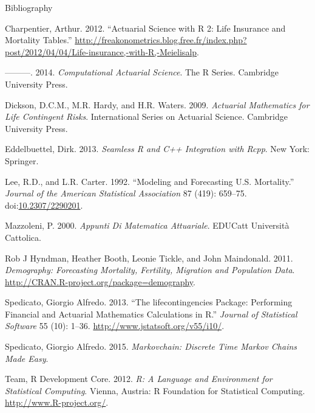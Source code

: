 \begin{frame}[allowframebreaks]{Bibliography}

Charpentier, Arthur. 2012. ``Actuarial Science with R 2: Life Insurance
and Mortality Tables.''
\url{http://freakonometrics.blog.free.fr/index.php?post/2012/04/04/Life-insurance,-with-R,-Meielisalp}.

---------. 2014. \emph{Computational Actuarial Science}. The R Series.
Cambridge University Press.

Dickson, D.C.M., M.R. Hardy, and H.R. Waters. 2009. \emph{Actuarial
Mathematics for Life Contingent Risks}. International Series on
Actuarial Science. Cambridge University Press.

Eddelbuettel, Dirk. 2013. \emph{Seamless R and C++ Integration with
Rcpp}. New York: Springer.

Lee, R.D., and L.R. Carter. 1992. ``Modeling and Forecasting U.S.
Mortality.'' \emph{Journal of the American Statistical Association} 87
(419): 659--75.
doi:\href{http://dx.doi.org/10.2307/2290201}{10.2307/2290201}.

Mazzoleni, P. 2000. \emph{Appunti Di Matematica Attuariale}. EDUCatt
Università Cattolica.

Rob J Hyndman, Heather Booth, Leonie Tickle, and John Maindonald. 2011.
\emph{Demography: Forecasting Mortality, Fertility, Migration and
Population Data}. \url{http://CRAN.R-project.org/package=demography}.

Spedicato, Giorgio Alfredo. 2013. ``The lifecontingencies Package:
Performing Financial and Actuarial Mathematics Calculations in R.''
\emph{Journal of Statistical Software} 55 (10): 1--36.
\url{http://www.jstatsoft.org/v55/i10/}.

Spedicato, Giorgio Alfredo. 2015. \emph{Markovchain: Discrete Time
Markov Chains Made Easy}.

Team, R Development Core. 2012. \emph{R: A Language and Environment for
Statistical Computing}. Vienna, Austria: R Foundation for Statistical
Computing. \url{http://www.R-project.org/}.

\end{frame}
